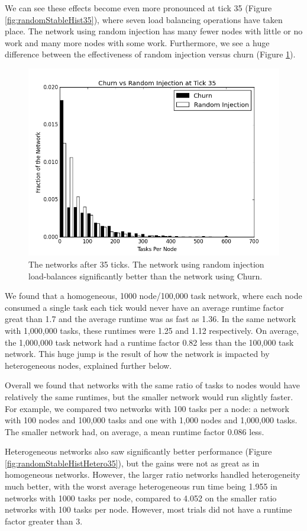 We can see these effects become even more pronounced at tick 35 (Figure \ref{fig:randomStableHist35}), where seven load balancing operations have taken place.
The network using random injection has many fewer nodes with little or no work and many more nodes with some work.
Furthermore, we see a huge difference between the effectiveness of random injection versus churn (Figure \ref{fig:churnInjectionHist35}).

\begin{figure}
	\centering
	\includegraphics[width=0.7\linewidth]{figs/churnInjectionHist35}
	\caption[Churn vs Random Injection after 35 ticks.]{The networks after 35 ticks.  The network using random injection load-balances significantly better than the network using Churn.}
	\label{fig:churnInjectionHist35}
\end{figure}

We found that a homogeneous, 1000 node/100,000 task network, where each node consumed a single task each tick would never have an average runtime factor great than 1.7 and the average runtime was as fast as 1.36.
In the same network with 1,000,000 tasks, these runtimes were 1.25 and 1.12 respectively.
On average, the 1,000,000 task network had a runtime factor 0.82 less than the 100,000 task network.
This huge jump is the result of how the network is impacted by heterogeneous nodes, explained further below.

Overall we found that networks with the same ratio of tasks to nodes would have relatively the same runtimes, but the smaller network would run slightly faster.
For example, we compared two networks with 100 tasks per a node: a network with 100 nodes and 100,000 tasks and one with 1,000 nodes and 1,000,000 tasks.
The smaller network had, on average, a mean runtime factor 0.086 less.

Heterogeneous networks also saw significantly better performance (Figure \ref{fig:randomStableHistHetero35}), but the gains were not as great as in homogeneous networks.
However, the larger ratio networks handled heterogeneity much better, with the worst average heterogeneous run time being 1.955 in networks with 1000 tasks per node, compared to 4.052 on the smaller ratio networks with 100 tasks per node.
However, most trials did not have a runtime factor greater than 3.


